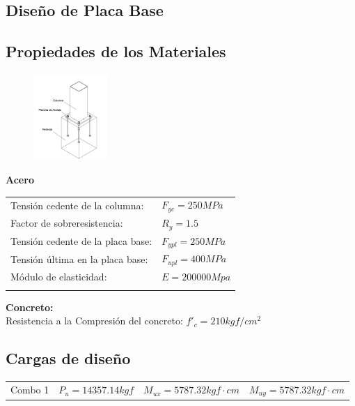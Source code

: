 \documentclass[12pt]{article}
\begin{document}
    
        \begin{center}
            \section{Diseño de Placa Base}
        \end{center}

        \subsection{Propiedades de los Materiales}

        \begin{figure}
            \includegraphics[width=0.25\textwidth]{esquema.png}
        \end{figure}

        \noindent \textbf{Acero}

        \begin{tabular}{l l}
            Tensión cedente de la columna:& $F_{yc} = 250 MPa$ \hspace{20cm}\\
            Factor de sobreresistencia:& $R_{y}=1.5$ \\
            Tensión cedente de la placa base:& $F_{ypl} = 250 MPa$ \\
            Tensión última en la placa base:& $F_{upl} = 400 MPa$ \\
            Módulo de elasticidad:& $E = 200 000 Mpa $ \\ \\
        \end{tabular}  


        \noindent \textbf{Concreto:}\\ 
        \indent Resistencia a la Compresión del concreto: $f'_{c} = 210 kgf/cm^{2} $
    
        \subsection{Cargas de diseño}
        \begin{tabular}{llll}
            Combo 1 & $P_{u}=14357.14 kgf$ & $M_{ux} = 5787.32 kgf \cdot cm $ & $M_{uy} = 5787.32 kgf \cdot cm $ \\
        \end{tabular}
     
\end{document}
